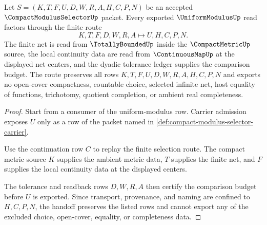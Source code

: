 \begin{theorem}
\label{thm:compact-modulus-selector-finite-net-selection}
Let $S=(K,T,F,U,D,W,R,A,H,C,P,N)$ be an accepted $\CompactModulusSelectorUp$ packet. Every exported $\UniformModulusUp$ read factors through the finite route
$$
K,T,F,D,W,R,A \longmapsto U,H,C,P,N .
$$
The finite net is read from $\TotallyBoundedUp$ inside the $\CompactMetricUp$ source, the local continuity data are read from $\ContinuousMapUp$ at the displayed net centers, and the dyadic tolerance ledger supplies the comparison budget. The route preserves all rows $K,T,F,U,D,W,R,A,H,C,P,N$ and exports no open-cover compactness, countable choice, selected infinite net, host equality of functions, trichotomy, quotient completion, or ambient real completeness.
\end{theorem}
\begin{proof}
Start from a consumer of the uniform-modulus row. Carrier admission exposes $U$ only as a row of the packet named in \autoref{def:compact-modulus-selector-carrier}.

Use the continuation row $C$ to replay the finite selection route. The compact metric source $K$ supplies the ambient metric data, $T$ supplies the finite net, and $F$ supplies the local continuity data at the displayed centers.

The tolerance and readback rows $D,W,R,A$ then certify the comparison budget before $U$ is exported. Since transport, provenance, and naming are confined to $H,C,P,N$, the handoff preserves the listed rows and cannot export any of the excluded choice, open-cover, equality, or completeness data.
\end{proof}


\begin{closurestatus}{\CompactModulusSelectorUp}
  \theoryclosure{\seedClosure}
  \formalstatus{\unformalizedV}
\end{closurestatus}
